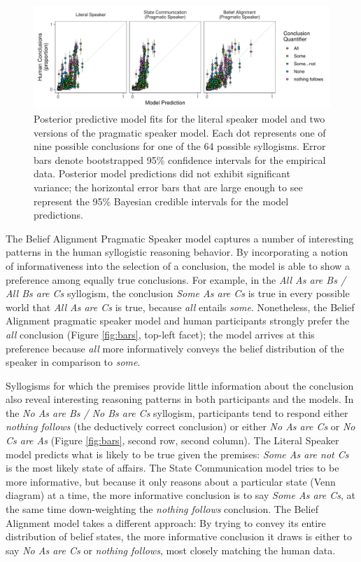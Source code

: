 \documentclass[floatsintext, man]{apa6}
\begin{document}
\begin{figure}[t]
\centering
\includegraphics[width = \textwidth]{bda_rsa_scatters_0paramPrior.pdf}
\caption{Posterior predictive model fits for the literal speaker model and two versions of the pragmatic speaker model. Each dot represents one of nine possible conclusions for one of the 64 possible syllogisms. Error bars denote bootstrapped 95\% confidence intervals for the empirical data. Posterior model predictions did not exhibit significant variance; the horizontal error bars that are large enough to see represent the 95\% Bayesian credible intervals for the model predictions.}
\label{fig:scatters}
\end{figure}

The Belief Alignment Pragmatic Speaker model captures a number of interesting patterns in the human syllogistic reasoning behavior. 
By incorporating a notion of informativeness into the selection of a conclusion, the model is able to  show a preference among equally true conclusions. For example, in the \emph{All As are Bs / All Bs are Cs} syllogism, the conclusion \emph{Some As are Cs} is true in every possible world that \emph{All As are Cs} is true, because \emph{all} entails \emph{some}. Nonetheless, the Belief Alignment pragmatic speaker model and human participants strongly prefer the \emph{all} conclusion (Figure \ref{fig:bars}, top-left facet); the model arrives at this preference because \emph{all} more informatively conveys the belief distribution of the speaker in comparison to \emph{some}.

Syllogisms for which the premises provide little information about the conclusion also reveal interesting reasoning patterns in both participants and the models.
In the \emph{No As are Bs / No Bs are Cs} syllogism, participants tend to respond either \emph{nothing follows} (the deductively correct conclusion) or either \emph{No As are Cs} or \emph{No Cs are As} (Figure \ref{fig:bars}, second row, second column). 
The Literal Speaker model predicts what is likely to be true given the premises: \emph{Some As are not Cs} is the most likely state of affairs. 
The State Communication model tries to be more informative, but because it only reasons about a particular state (Venn diagram) at a time, the more informative conclusion is to say \emph{Some As are Cs}, at the same time down-weighting the \emph{nothing follows} conclusion.
The Belief Alignment model takes a different approach: By trying to convey its entire distribution of belief states, the more informative conclusion it draws is either to say \emph{No As are Cs} or \emph{nothing follows}, most closely matching the human data. 
\end{document}

